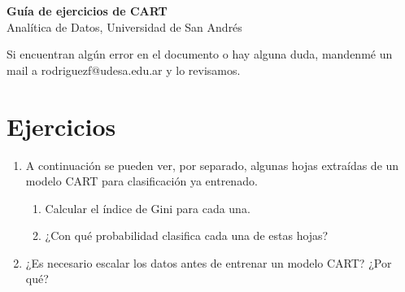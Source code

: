 \documentclass[12pt]{article}
\begin{document}
\begin{center}
  {\LARGE \textbf{Guía de ejercicios de CART}}\\[0.5em]
  {Analítica de Datos, Universidad de San Andrés}
\end{center}

Si encuentran algún error en el documento o hay alguna duda, mandenmé un mail a rodriguezf@udesa.edu.ar y lo revisamos.

\section*{Ejercicios}

\begin{enumerate}
  \item A continuación se pueden ver, por separado, algunas hojas extraídas de un modelo CART para clasificación ya entrenado.
  
    \begin{center}
    \end{center}

    \begin{enumerate}
      \item Calcular el índice de Gini para cada una.
      \item ¿Con qué probabilidad clasifica cada una de estas hojas?
    \end{enumerate}

  \item ¿Es necesario escalar los datos antes de entrenar un modelo CART? ¿Por qué?


\end{enumerate}
\end{document}

